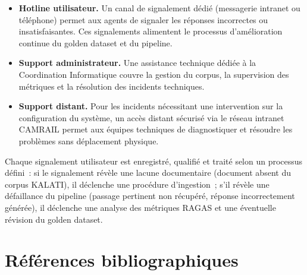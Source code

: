 \documentclass[12pt,a4paper]{report}
\begin{document}
\begin{itemize}
  \item \textbf{Hotline utilisateur.} Un canal de signalement dédié (messagerie intranet ou
    téléphone) permet aux agents de signaler les réponses incorrectes ou insatisfaisantes. Ces
    signalements alimentent le processus d'amélioration continue du golden dataset et du pipeline.
  \item \textbf{Support administrateur.} Une assistance technique dédiée à la Coordination
    Informatique couvre la gestion du corpus, la supervision des métriques et la résolution des
    incidents techniques.
  \item \textbf{Support distant.} Pour les incidents nécessitant une intervention sur la
    configuration du système, un accès distant sécurisé via le réseau intranet CAMRAIL permet
    aux équipes techniques de diagnostiquer et résoudre les problèmes sans déplacement physique.
\end{itemize}

Chaque signalement utilisateur est enregistré, qualifié et traité selon un processus défini~:
si le signalement révèle une lacune documentaire (document absent du corpus KALATI), il déclenche
une procédure d'ingestion~; s'il révèle une défaillance du pipeline (passage pertinent non
récupéré, réponse incorrectement générée), il déclenche une analyse des métriques RAGAS et une
éventuelle révision du golden dataset.

\chapter*{Références bibliographiques}

\nocite{*}
\printbibliography[heading=none]
\end{document}
